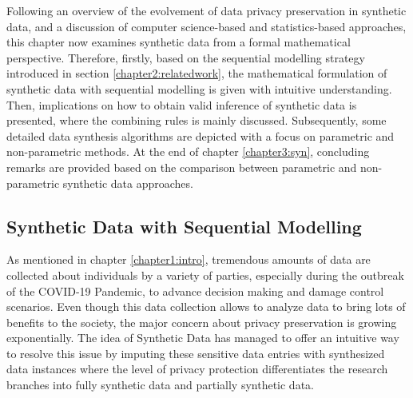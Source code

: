 Following an overview of the evolvement of data privacy preservation in synthetic data, and a discussion of computer science-based and statistics-based approaches, this chapter now examines synthetic data from a formal mathematical perspective. Therefore, firstly, based on the sequential modelling strategy introduced in section \ref{chapter2:relatedwork}, the mathematical formulation of synthetic data with sequential modelling is given with intuitive understanding. Then, implications on how to obtain valid inference of synthetic data is presented, where the combining rules is mainly discussed. Subsequently, some detailed data synthesis algorithms are depicted with a focus on parametric and non-parametric methods. At the end of chapter \ref{chapter3:syn}, concluding remarks are provided based on the comparison between parametric and non-parametric synthetic data approaches.

\subsection{Synthetic Data with Sequential Modelling}
\label{subsec:syntheticData}
As mentioned in chapter \ref{chapter1:intro}, tremendous amounts of data are collected about individuals by a variety of parties, especially during the outbreak of the COVID-19 Pandemic, to advance decision making and damage control scenarios. Even though this data collection allows to analyze data to bring lots of benefits to the society, the major concern about privacy preservation is growing exponentially. The idea of Synthetic Data has managed to offer an intuitive way to resolve this issue by imputing these sensitive data entries with synthesized data instances where the level of privacy protection differentiates the research branches into fully synthetic data and partially synthetic data.

